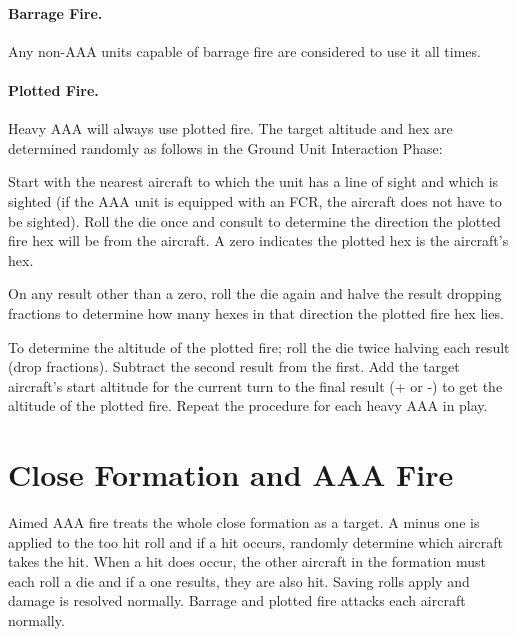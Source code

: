 \begin{advancedrules}
\paragraph{Barrage Fire.} Any non-AAA units capable of barrage fire are considered to use it all times.

\paragraph{Plotted Fire.} Heavy AAA will always use plotted fire. The target altitude and hex are determined randomly as follows in the Ground Unit Interaction Phase:

Start with the nearest aircraft to which the unit has a line of sight and which is sighted (if the AAA unit is equipped with an FCR, the aircraft does not have to be sighted). Roll the die once and consult  to determine the direction the plotted fire hex will be from the aircraft. A zero indicates the plotted hex is the aircraft's hex.

On any result other than a zero, roll the die again and halve the result dropping fractions to determine how many hexes in that direction the plotted fire hex lies.

To determine the altitude of the plotted fire; roll the die twice halving each result (drop fractions). Subtract the second result from the first. Add the target aircraft's start altitude for the current turn to the final result (+ or -) to get the altitude of the plotted fire. Repeat the procedure for each heavy AAA in play.

\section{Close Formation and AAA Fire}

Aimed AAA fire treats the whole close formation as a target. A minus one is applied to the too hit roll and if a hit occurs, randomly determine which aircraft takes the hit. When a hit does occur, the other aircraft in the formation must each roll a die and if a one results, they are also hit. Saving rolls apply and damage is resolved normally. Barrage and plotted fire attacks each aircraft normally.

\end{advancedrules}
